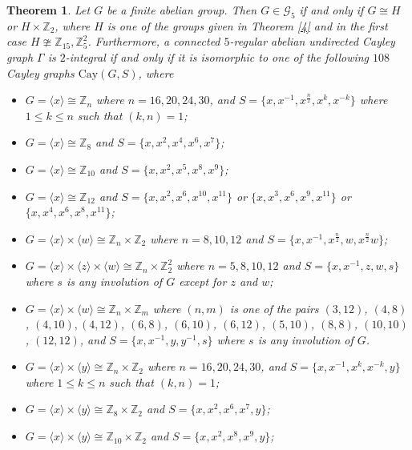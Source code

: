\documentclass[12pt,a4paper]{article}
\newtheorem{thm}{Theorem}[section]
\def \leq {\leqslant}
\begin{document}
	\begin{thm}\label{5}
		Let $G$ be a finite abelian group. Then $G\in\mathcal{G}_5$ if and only if $G\cong H$ or $H\times\mathbb Z_2$, where $H$ is one of the groups given in Theorem \ref{4} and in the first case $H\ncong\mathbb Z_{15},\mathbb Z_5^2$.
		Furthermore, a connected $5$-regular abelian undirected Cayley graph $\Gamma$ is $2$-integral if and only if it is isomorphic to one of the  following $108$ Cayley graphs $\mathrm{Cay}(G,S)$, where
		\begin{itemize}
			\item[$\romannumeral1$.] $G=\langle x\rangle \cong \mathbb{Z}_n$ where $n=16,20,24,30$, and $S=\{x,x^{-1},x^{\frac{n}{2}},x^k,x^{-k}\}$ where $1\leq k\leq n$ such that $(k,n)=1$;
			\item[$\romannumeral2$.] $G=\langle x\rangle \cong \mathbb{Z}_8$ and $S=\{x,x^2,x^4,x^6,x^7\}$;		
			\item[$\romannumeral3$.] $G=\langle x\rangle \cong \mathbb{Z}_{10}$ and $S=\{x,x^2,x^5,x^8,x^9\}$;
			\item[$\romannumeral4$.] $G=\langle x\rangle \cong \mathbb{Z}_{12}$ and $S=\{x,x^2,x^6,x^{10},x^{11}\}$ or $\{x,x^3,x^6,x^9,x^{11}\}$ or $\{x,x^4,x^6,x^8,x^{11}\}$;
			\item[$\romannumeral5$.] $G=\langle x\rangle\times \langle w\rangle\cong \mathbb{Z}_n\times \mathbb{Z}_2$ where $n=8,10,12$ and $S=\{x,x^{-1},x^{\frac{n}{2}},w,x^{\frac{n}{2}}w\}$;
			\item[$\romannumeral6$.] $G=\langle x\rangle\times \langle z\rangle\times \langle w\rangle\cong\mathbb{Z}_n\times \mathbb{Z}_2^2$ where $n=5,8,10,12$ and $S=\{x,x^{-1},z,w,s\}$ where $s$ is any involution of $G$ except for $z$ and $w$;
			\item[$\romannumeral7$.] $G=\langle x\rangle\times \langle w\rangle\cong \mathbb{Z}_n\times \mathbb{Z}_m$ where $(n,m)$ is one of the pairs $(3,12)$, $(4,8)$, $(4,10),(4,12)$, $(6,8)$, $(6,10)$, $(6,12)$, $(5,10)$, $(8,8)$, $(10,10)$, $(12,12)$, and $S=\{x,x^{-1},y,y^{-1},s\}$ where $s$ is any involution of $G$.
			\item[$\romannumeral8$.] $G=\langle x\rangle \times \langle y\rangle\cong \mathbb{Z}_n\times \mathbb{Z}_2$ where $n=16,20,24,30$, and $S=\{x,x^{-1},x^k,x^{-k},y\}$ where $1\leq k\leq n$ such that $(k,n)=1$;
			\item[$\romannumeral9$.] $G=\langle x\rangle \times \langle y\rangle\cong \mathbb{Z}_8\times \mathbb{Z}_2$ and $S=\{x,x^2,x^6,x^7,y\}$;		
			\item[$\romannumeral10$.] $G=\langle x\rangle\times \langle y\rangle \cong \mathbb{Z}_{10}\times \mathbb{Z}_2$ and $S=\{x,x^2,x^8,x^9,y\}$;

\end{itemize}
\end{thm}
\end{document}
